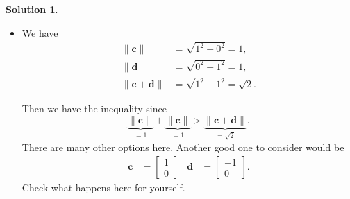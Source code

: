 \documentclass[12pt]{report} %
\theoremstyle{definition}
\newtheorem{solution}{Solution}
\begin{document}
\begin{solution}
\begin{itemize}
    \item We have
    \begin{align*}
    \|\mathbf{c}\|&=\sqrt{1^2+0^2}=1,\\
    \|\mathbf{d}\|&=\sqrt{0^2+1^2}=1,\\
    \|\mathbf{c}+\mathbf{d}\|&= \sqrt{1^2+1^2}=\sqrt{2}.
    \end{align*}
        \begin{center}
        \end{center}
    
    Then we have the inequality since
    \[
    \underbrace{\|\mathbf{c}\|}_{=1}+\underbrace{\|\mathbf{c}\|}_{=1}>\underbrace{\|\mathbf{c}+\mathbf{d}\|}_{=\sqrt{2}}.
    \]
    There are many other options here. Another good one to consider would be
    \begin{align*}
            \mathbf{c}&= \begin{bmatrix} 1\\ 0 \end{bmatrix}&
    \mathbf{d}&= \begin{bmatrix} -1\\ 0 \end{bmatrix}.
    \end{align*}
    Check what happens here for yourself.
\end{itemize}
\end{solution}
\hspace{.5cm}
\end{document}
